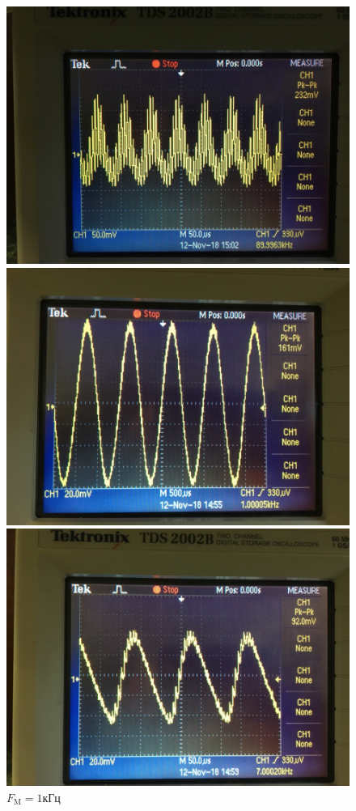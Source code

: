 \begin{figure}[h!]
	\begin{minipage}{0.33\linewidth}
		\centering
		\includegraphics[width=0.9\linewidth]{photo/15kHztau1.jpg}
		\caption*{$R_1C_1$}
	\end{minipage}
	\begin{minipage}{0.33\linewidth}
		\centering
		\includegraphics[width=0.9\linewidth]{photo/1kHztau2.jpg}
		\caption*{$R_2C_2$}
		\caption*{$F_\text{M}=1\text{кГц}$}
	\end{minipage}
	\begin{minipage}{0.33\linewidth}
		\centering
		\includegraphics[width=0.9\linewidth]{photo/7kHztau2.jpg}

\end{minipage}
\end{figure}
